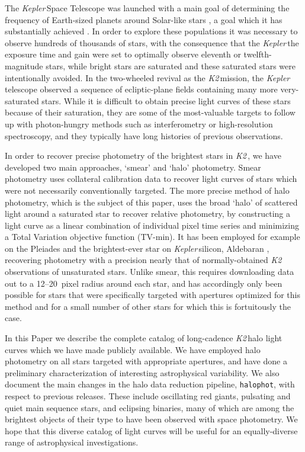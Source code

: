\documentclass[modern]{aastex62}
\newcommand\kepler{\emph{Kepler}\,}
\newcommand\ktwo{\emph{K2}\,}
\begin{document}
The \kepler Space Telescope was launched with a main goal of determining the frequency of Earth-sized planets around Solar-like stars \citep{2010sci...327..977b}, a goal which it has substantially achieved \citep[e.g.][]{2013ApJ...766...81F,2013PNAS..11019273P,2014ApJ...795...64F}. In order to explore these populations it was necessary to observe hundreds of thousands of stars, with the consequence that the \kepler the exposure time and gain were set to optimally observe eleventh or twelfth-magnitude stars, while bright stars are saturated and these saturated stars were intentionally avoided. In the two-wheeled revival as the \ktwo mission, the \kepler telescope observed a sequence of ecliptic-plane fields containing many more very-saturated stars. While it is difficult to obtain precise light curves of these stars because of their saturation, they are some of the most-valuable targets to follow up with photon-hungry methods such as interferometry or high-resolution spectroscopy, and they typically have long histories of previous observations. 

In order to recover precise photometry of the brightest stars in \ktwo, we have developed two main approaches, `smear' and `halo' photometry. Smear photometry \citep{Pope2016} uses collateral calibration data to recover light curves of stars which were not necessarily conventionally targeted. The more precise method of halo photometry, which is the subject of this paper, uses the broad `halo' of scattered light around a saturated star to recover relative photometry, by constructing a light curve as a linear combination of individual pixel time series and minimizing a Total Variation objective function (TV-min). It has been employed for example on the Pleiades \citep{White2017} and the brightest-ever star on \kepler silicon, Aldebaran \citep{Farr2018}, recovering photometry with a precision nearly that of normally-obtained \ktwo observations of unsaturated stars. Unlike smear, this requires downloading data out to a 12--20~pixel radius around each star, and has accordingly only been possible for stars that were specifically targeted with apertures optimized for this method and for a small number of other stars for which this is fortuitously the case.

In this Paper we describe the complete catalog of long-cadence \ktwo halo light curves which we have made publicly available. We have employed halo photometry on all stars targeted with appropriate apertures, and have done a preliminary characterization of interesting astrophysical variability. We also document the main changes in the halo data reduction pipeline, \texttt{halophot}, with respect to previous releases. These include oscillating red giants, pulsating and quiet main sequence stars, and eclipsing binaries, many of which are among the brightest objects of their type to have been observed with space photometry. We hope that this diverse catalog of light curves will be useful for an equally-diverse range of astrophysical investigations. 
\end{document}
